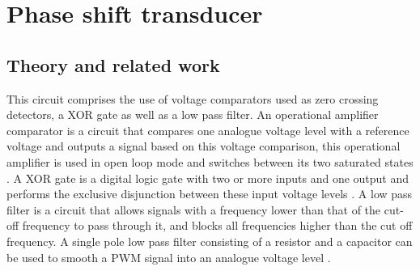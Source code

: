 \chapter{Phase shift transducer}
\section{Theory and related work} \label{sec:literature_phasetransducer}
This circuit comprises the use of voltage comparators used as zero crossing detectors, a XOR gate as well as a low pass filter. An operational amplifier comparator is a circuit that compares one analogue voltage level with a reference voltage and outputs a signal based on this voltage comparison, this operational amplifier is used in open loop mode and switches between its two saturated states \cite{OpAmpComparator}.\vspace{4mm} \newline 
A XOR gate is a digital logic gate with two or more inputs and one output and performs the exclusive disjunction between these input voltage levels \cite{XORGate}.
A low pass filter is a circuit that allows signals with a frequency lower than that of the cut-off frequency to pass through it, and blocks all frequencies higher than the cut off frequency. A single pole low pass filter consisting of a resistor and a capacitor can be used to smooth a PWM signal into an analogue voltage level \cite{PWMref}.

